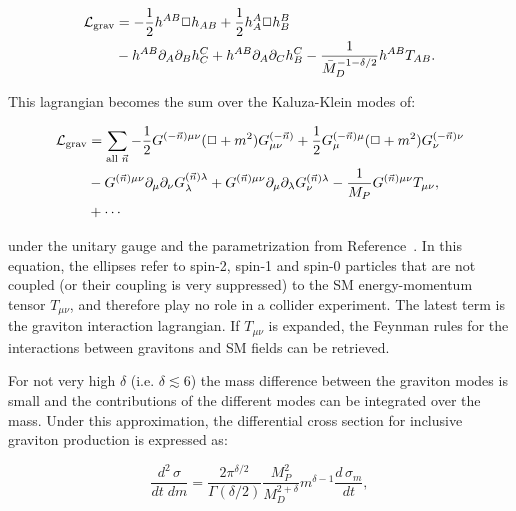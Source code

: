 \begin{equation}
\begin{split}
\mathcal{L}_{\text{grav}} &= -\frac{1}{2}h^{AB} \Box h_{AB} + \frac{1}{2}h^A_A \Box h^B_B \\
&- h^{AB} \partial_A \partial_B h_C^C + h^{AB} \partial_A \partial_C h_B^C - \frac{1}{\bar{M}_D^{-1-\delta/2}} h^{AB} T_{AB}.
\end{split}
\label{eq:ADDGravitonLagrangian}
\end{equation}

This lagrangian becomes the sum over the Kaluza-Klein modes of:

\begin{equation}
\begin{split}
\mathcal{L}_{\text{grav}} &= \sum_{\text{all }\vec{n}} -\frac{1}{2} G^{(-\vec{n})\mu\nu} (\Box + m^2)G^{(-\vec{n})}_{\mu\nu} + \frac{1}{2} G^{(-\vec{n})\mu}_{\mu} (\Box + m^2) G^{(-\vec{n})\nu}_{\nu} \\
&- G^{(\vec{n})\mu\nu} \partial_\mu \partial_\nu G^{(\vec{n})\lambda}_{\lambda} + G^{(\vec{n})\mu\nu} \partial_\mu \partial_\lambda G^{(\vec{n})\lambda}_{\nu} - \frac{1}{M_P}G^{(\vec{n})\mu\nu}T_{\mu\nu}, \\
&+ \cdots \\
\end{split}
\label{eq:ADDGravitonLagrangian4D}
\end{equation}

\noindent under the unitary gauge and the parametrization from Reference~\cite{Giudice:1998ck}.
In this equation, the ellipses refer to spin-2, spin-1 and spin-0 particles that are not coupled (or their coupling is very suppressed) to the SM energy-momentum tensor $T_{\mu\nu}$, and therefore play no role in a collider experiment.
The latest term is the graviton interaction lagrangian.
If $T_{\mu\nu}$ is expanded, the Feynman rules for the interactions between gravitons and SM fields can be retrieved.

For not very high $\delta$ (i.e. $\delta \lesssim 6$) the mass difference between the graviton modes is small and the contributions of the different modes can be integrated over the mass.
Under this approximation, the differential cross section for inclusive graviton production is expressed as:

\begin{equation}
\frac{d^2\,\sigma}{dt\; dm} = \frac{2\pi^{\delta/2}}{\Gamma(\delta/2)} \frac{M_P^2}{M_D^{2+\delta}} m^{\delta-1} \frac{d\, \sigma_m}{dt},
\label{eq:ADDCrossSectionmass}
\end{equation}

